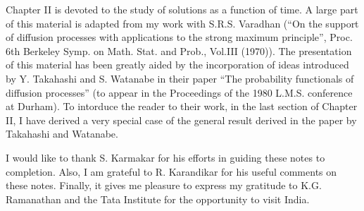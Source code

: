 Chapter II is devoted to the study of solutions as a function of
time. A large part of this material is adapted from my work with
S.R.S. Varadhan (``On the support of diffusion processes with
applications to the strong maximum principle'', Proc. 6th Berkeley
Symp. on Math. Stat. and Prob., Vol.III (1970)). The presentation of
this material has been greatly aided by the incorporation of ideas
introduced by Y. Takahashi and S. Watanabe in their paper ``The
probability functionals of diffusion processes'' (to appear in the
Proceedings of the 1980 L.M.S. conference at Durham). To intorduce the
reader to their work, in the last section of Chapter II, I have
derived a very special case of the general result derived in the paper
by Takahashi and Watanabe.

I would like to thank S. Karmakar for his efforts in guiding these
notes to completion. Also, I am grateful to R. Karandikar for his
useful comments on these notes. Finally, it gives me pleasure to
express my gratitude to K.G. Ramanathan and the Tata Institute for the
opportunity to visit India.




